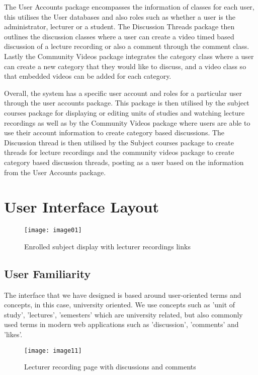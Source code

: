 \documentclass{article}
\begin{document}
The User Accounts package encompasses the information of classes for each user, this utilises the User databases and also roles such as whether a user is the administrator, lecturer or a student. The Discussion Threads package then outlines the discussion classes where a user can create a video timed based discussion of a lecture recording or also a comment through the comment class. Lastly the Community Videos package integrates the category class where a user can create a new category that they would like to discuss, and a video class so that embedded videos can be added for each category.

Overall, the system has a specific user account and roles for a particular user through the user accounts package. This package is then utilised by the subject courses package for displaying or editing units of studies and watching lecture recordings as well as by the Community Videos package where users are able to use their account information to create category based discussions.  The Discussion thread is then utilised by the Subject courses package to create threads for lecture recordings and the community videos package to create category based discussion threads, posting as a user based on the information from the User Accounts package.

\section{User Interface Layout}
\begin{figure}[h!]
\centering
\texttt{[image: image01]}
\caption{Enrolled subject display with lecturer recordings links}
\end{figure}

\subsection{User Familiarity}
The interface that we have designed is based around user-oriented terms and concepts, in this case, university oriented. We use concepts such as 'unit of study', 'lectures', 'semesters' which are university related, but also commonly used terms in modern web applications such as 'discussion', 'comments' and 'likes'.

\begin{figure}[h!]
\centering
\texttt{[image: image11]}
\caption{Lecturer recording page with discussions and comments}
\end{figure}
\end{document}
